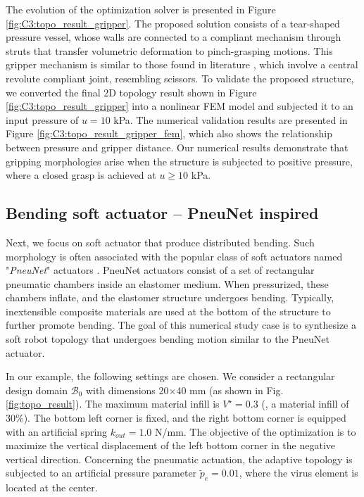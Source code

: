 The evolution of the optimization solver is presented in Figure \ref{fig:C3:topo_result_gripper}. The proposed solution consists of a tear-shaped pressure vessel, whose walls are connected to a compliant mechanism through struts that transfer volumetric deformation to pinch-grasping motions. This gripper mechanism is similar to those found in literature \cite{Gain2013Dec,Bendsoe2003}, which involve a central revolute compliant joint, resembling scissors. To validate the proposed structure, we converted the final 2D topology result shown in Figure \ref{fig:C3:topo_result_gripper} into a nonlinear FEM model and subjected it to an input pressure of $u = 10$ \si{\kilo \pascal}. The numerical validation results are presented in Figure \ref{fig:C3:topo_result_gripper_fem}, which also shows the relationship between pressure and gripper distance. Our numerical results demonstrate that gripping morphologies arise when the structure is subjected to positive pressure, where a closed grasp is achieved at $u \ge 10$ \si{\kilo \pascal}.

\subsection{Bending soft actuator -- PneuNet inspired}
\label{sec:C3:PneuNet_results}
Next, we focus on soft actuator that produce distributed bending. Such morphology is often associated with the popular class of soft actuators named "\emph{PneuNet}" actuators \cite{Polygerinos2013,Polygerinos2015,Galloway2016,Hughes2016Nov,Marchese2015}. PneuNet actuators consist of a set of rectangular pneumatic chambers inside an elastomer medium. When pressurized, these chambers inflate, and the elastomer structure undergoes bending. Typically, inextensible composite materials are used at the bottom of the structure to further promote bending. The goal of this numerical study case is to synthesize a soft robot topology that undergoes bending motion similar to the PneuNet actuator. 

In our example, the following settings are chosen. We consider a rectangular design domain $\mathcal{B}_0$ with dimensions 20$\times$40 mm (as shown in Fig. \ref{fig:topo_result}). The maximum material infill is $V^\star = 0.3$ (\ie, a material infill of 30\%). The bottom left corner is fixed, and the right bottom corner is equipped with an artificial spring $k_{out} = 1.0$ N/mm. The objective of the optimization is to maximize the vertical displacement of the left bottom corner in the negative vertical direction. Concerning the pneumatic actuation, the adaptive topology is subjected to an artificial pressure parameter $\tilde{p}_e = 0.01$, where the virus element is located at the center.

